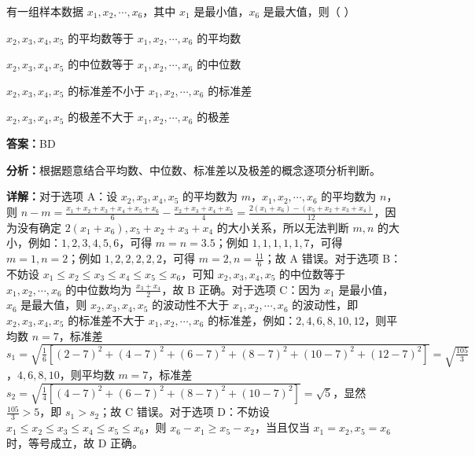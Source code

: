 \begin{question}[points=5]
有一组样本数据 $x_1, x_2, \cdots, x_6$，其中 $x_1$ 是最小值，$x_6$ 是最大值，则（ ）
\begin{choices}
  \item $x_2, x_3, x_4, x_5$ 的平均数等于 $x_1, x_2, \cdots, x_6$ 的平均数
  \item $x_2, x_3, x_4, x_5$ 的中位数等于 $x_1, x_2, \cdots, x_6$ 的中位数
  \item $x_2, x_3, x_4, x_5$ 的标准差不小于 $x_1, x_2, \cdots, x_6$ 的标准差
  \item $x_2, x_3, x_4, x_5$ 的极差不大于 $x_1, x_2, \cdots, x_6$ 的极差
\end{choices}
\begin{solution}
\textbf{答案：}BD

\textbf{分析：}根据题意结合平均数、中位数、标准差以及极差的概念逐项分析判断。

\textbf{详解：}对于选项 A：设 $x_2, x_3, x_4, x_5$ 的平均数为 $m$，$x_1, x_2, \cdots, x_6$ 的平均数为 $n$，则 $n-m=\frac{x_1+x_2+x_3+x_4+x_5+x_6}{6}-\frac{x_2+x_3+x_4+x_5}{4}=\frac{2(x_1+x_6)-(x_5+x_2+x_3+x_4)}{12}$，因为没有确定 $2(x_1+x_6), x_5+x_2+x_3+x_4$ 的大小关系，所以无法判断 $m,n$ 的大小，例如：$1,2,3,4,5,6$，可得 $m=n=3.5$；例如 $1,1,1,1,1,7$，可得 $m=1, n=2$；例如 $1,2,2,2,2,2$，可得 $m=2, n=\frac{11}{6}$；故 A 错误。对于选项 B：不妨设 $x_1\leq x_2\leq x_3\leq x_4\leq x_5\leq x_6$，可知 $x_2, x_3, x_4, x_5$ 的中位数等于 $x_1, x_2, \cdots, x_6$ 的中位数均为 $\frac{x_3+x_4}{2}$，故 B 正确。对于选项 C：因为 $x_1$ 是最小值，$x_6$ 是最大值，则 $x_2, x_3, x_4, x_5$ 的波动性不大于 $x_1, x_2, \cdots, x_6$ 的波动性，即 $x_2, x_3, x_4, x_5$ 的标准差不大于 $x_1, x_2, \cdots, x_6$ 的标准差，例如：$2,4,6,8,10,12$，则平均数 $n=7$，标准差 $s_1=\sqrt{\frac{1}{6}[(2-7)^2+(4-7)^2+(6-7)^2+(8-7)^2+(10-7)^2+(12-7)^2]}=\sqrt{\frac{105}{3}}$，$4,6,8,10$，则平均数 $m=7$，标准差 $s_2=\sqrt{\frac{1}{4}[(4-7)^2+(6-7)^2+(8-7)^2+(10-7)^2]}=\sqrt{5}$，显然 $\frac{105}{3}>5$，即 $s_1>s_2$；故 C 错误。对于选项 D：不妨设 $x_1\leq x_2\leq x_3\leq x_4\leq x_5\leq x_6$，则 $x_6-x_1\geq x_5-x_2$，当且仅当 $x_1=x_2, x_5=x_6$ 时，等号成立，故 D 正确。
\end{solution}
\end{question}

